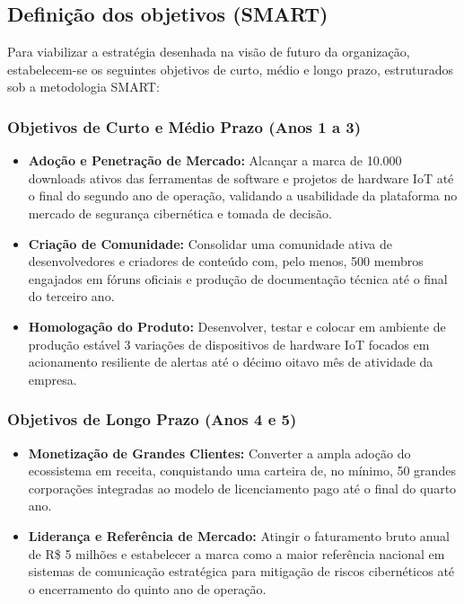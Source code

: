 \subsection{Definição dos objetivos (SMART)}

Para viabilizar a estratégia desenhada na visão de futuro da organização, estabelecem-se os seguintes objetivos de curto, médio e longo prazo, estruturados sob a metodologia SMART:

\subsubsection{Objetivos de Curto e Médio Prazo (Anos 1 a 3)}

\begin{itemize}
    \item \textbf{Adoção e Penetração de Mercado:} Alcançar a marca de 10.000 downloads ativos das ferramentas de software e projetos de hardware IoT até o final do segundo ano de operação, validando a usabilidade da plataforma no mercado de segurança cibernética e tomada de decisão.
    \item \textbf{Criação de Comunidade:} Consolidar uma comunidade ativa de desenvolvedores e criadores de conteúdo com, pelo menos, 500 membros engajados em fóruns oficiais e produção de documentação técnica até o final do terceiro ano.
    \item \textbf{Homologação do Produto:} Desenvolver, testar e colocar em ambiente de produção estável 3 variações de dispositivos de hardware IoT focados em acionamento resiliente de alertas até o décimo oitavo mês de atividade da empresa.
\end{itemize}

\subsubsection{Objetivos de Longo Prazo (Anos 4 e 5)}

\begin{itemize}
    \item \textbf{Monetização de Grandes Clientes:} Converter a ampla adoção do ecossistema em receita, conquistando uma carteira de, no mínimo, 50 grandes corporações integradas ao modelo de licenciamento pago até o final do quarto ano.
    \item \textbf{Liderança e Referência de Mercado:} Atingir o faturamento bruto anual de R\$ 5 milhões e estabelecer a marca como a maior referência nacional em sistemas de comunicação estratégica para mitigação de riscos cibernéticos até o encerramento do quinto ano de operação.
\end{itemize}
